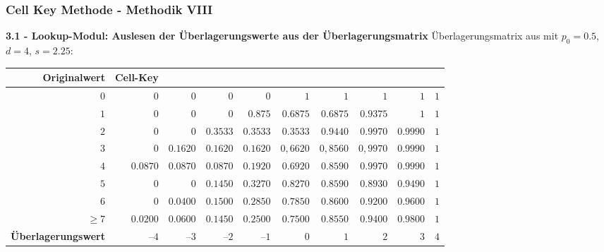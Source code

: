 \documentclass[aspectratio=169]{beamer}
\begin{document}
\begin{frame}{}
	\frametitle{Cell Key Methode - Methodik VIII}
    \textbf{3.1 - Lookup-Modul:  Auslesen der Überlagerungswerte aus der Überlagerungsmatrix}
    Überlagerungsmatrix aus \cite{Höhne} mit $p_0 = 0.5$, $d = 4$, $s = 2.25$:
    \begin{footnotesize}
    \begin{center}
        \begin{tabular}{ r r r r r r r r r r }
            \textbf{Originalwert} \vline & \textbf{Cell-Key} & & & & & & & & \\ 
            \hline
            $0$ \vline & $0$ & $0$ & $0$ & $0$ & $1$ & $1$ & $1$ & $1$ & $1$ \\
            $1$ \vline & $0$ & $0$ & $0$ & $0.875$ & $0.6875$ & $0.6875$ & $0.9375$ & $1$ & $1$ \\
            $2$ \vline & $0$ & $0$ & $0.3533$ & $0.3533$ & $0.3533$ & $0.9440$ & $0.9970$ & $0.9990$ & $1$ \\
            $3$ \vline & $0$ & $0.1620$ & $0.1620$ & $0.1620$ & $0,6620$ & $0,8560$ & $0,9970$ & $0.9990$ & $1$ \\
            $4$ \vline & $0.0870$ & $0.0870$ & $0.0870$ & $0.1920$ & $0.6920$ & $0.8590$ & $0.9970$ & $0.9990$ & $1$ \\
            $5$ \vline & $0$ & $0$ & $0.1450$ & $0.3270$ & $0.8270$ & $0.8590$ & $0.8930$ & $0.9490$ & $1$ \\
            $6$ \vline & $0$ & $0.0400$ & $0.1500$ & $0.2850$ & $0.7850$ & $0.8600$ & $0.9200$ & $0.9600$ & $1$ \\
            $\geq 7$ \vline & $0.0200$ & $0.0600$ & $0.1450$ & $0.2500$ & $0.7500$ & $0.8550$ & $0.9400$ & $0.9800$ & $1$ \\
            \hline
            \textbf{Überlagerungswert} \vline & $–4$ & $–3$ & $–2$ & $–1$ & $0$ & $1$ & $2$ & $3$ & $4$
        \end{tabular}
    \end{center}
    \end{footnotesize}
\end{frame}
\end{document}
